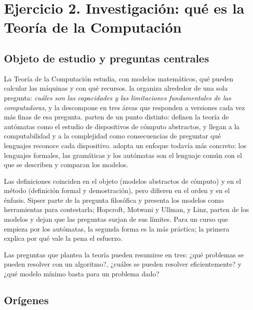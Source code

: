 \hypertarget{ejercicio-2.-investigaciuxf3n-quuxe9-es-la-teoruxeda-de-la-computaciuxf3n}{%
\section{Ejercicio 2. Investigación: qué es la Teoría de la Computación}\label{ejercicio-2.-investigaciuxf3n-quuxe9-es-la-teoruxeda-de-la-computaciuxf3n}}

\hypertarget{objeto-de-estudio-y-preguntas-centrales}{%
\subsection{Objeto de estudio y preguntas centrales}\label{objeto-de-estudio-y-preguntas-centrales}}

La Teoría de la Computación estudia, con modelos matemáticos, qué pueden calcular las máquinas y con qué recursos. \textcite[cap. 0]{sipser2013} la organiza alrededor de una sola pregunta: \emph{cuáles son las capacidades y las limitaciones fundamentales de las computadoras}, y la descompone en tres áreas que responden a versiones cada vez más finas de esa pregunta. \textcite[cap. 1]{hopcroft2007} parten de un punto distinto: definen la teoría de autómatas como el estudio de dispositivos de cómputo abstractos, y llegan a la computabilidad y a la complejidad como consecuencias de preguntar qué lenguajes reconoce cada dispositivo. \textcite[cap. 1]{linz2017} adopta un enfoque todavía más concreto: los lenguajes formales, las gramáticas y los autómatas son el lenguaje común con el que se describen y comparan los modelos.

Las definiciones coinciden en el objeto (modelos abstractos de cómputo) y en el método (definición formal y demostración), pero difieren en el orden y en el énfasis. Sipser parte de la pregunta filosófica y presenta los modelos como herramientas para contestarla; Hopcroft, Motwani y Ullman, y Linz, parten de los modelos y dejan que las preguntas surjan de sus límites. Para un curso que empieza por los autómatas, la segunda forma es la más práctica; la primera explica por qué vale la pena el esfuerzo.

Las preguntas que plantea la teoría pueden resumirse en tres: ¿qué problemas se pueden resolver con un algoritmo?, ¿cuáles se pueden resolver eficientemente? y ¿qué modelo mínimo basta para un problema dado?

\hypertarget{oruxedgenes}{%
\subsection{Orígenes}\label{oruxedgenes}}

